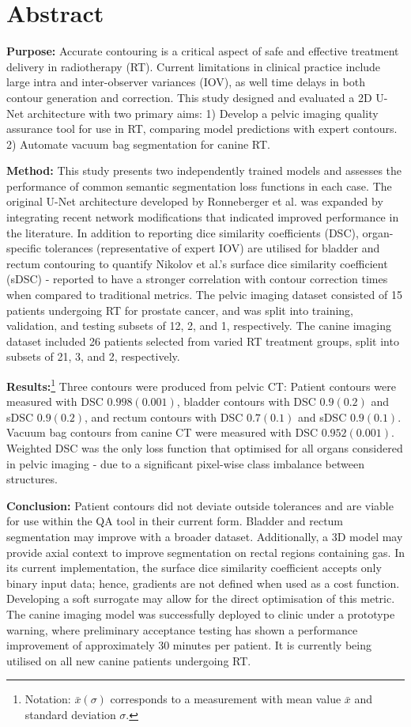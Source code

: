 \chapter{Abstract} \label{ch:abstract}

\textbf{Purpose:} Accurate contouring is a critical aspect of safe and effective
treatment delivery in radiotherapy (RT). Current limitations in clinical
practice include large intra and inter-observer variances (IOV), as well time
delays in both contour generation and correction. This study designed and
evaluated a 2D U-Net architecture with two primary aims:
1) Develop a pelvic imaging quality assurance tool for use in
RT, comparing model predictions with expert contours. 2) Automate vacuum bag
segmentation for canine RT.

\textbf{Method:} This study presents two independently trained models and
assesses the performance of common semantic segmentation loss functions in each
case. The original U-Net architecture developed by Ronneberger et al. was
expanded by integrating recent network modifications that indicated improved
performance in the literature. In addition to reporting dice similarity
coefficients (DSC), organ-specific tolerances (representative of expert IOV) are
utilised for bladder and rectum contouring to quantify Nikolov et al.'s surface
dice similarity coefficient (sDSC) - reported to have a stronger
correlation with contour correction times when compared to traditional metrics.
The pelvic imaging dataset consisted of 15 patients undergoing RT for prostate
cancer, and was split into training, validation, and testing subsets of 12, 2,
and 1, respectively. The canine imaging dataset included 26 patients selected
from varied RT treatment groups, split into subsets of 21, 3, and 2, respectively.

\textbf{Results:}\footnote{Notation: $\bar{x}(\sigma)$ corresponds to a
measurement with mean value $\bar{x}$ and standard deviation $\sigma$.} Three
contours were produced from pelvic CT: Patient contours were measured with DSC
$0.998(0.001)$, bladder contours with DSC $0.9(0.2)$ and sDSC $0.9(0.2)$, and
rectum contours with DSC $0.7(0.1)$ and sDSC $0.9(0.1)$. Vacuum bag contours
from canine CT were measured with DSC $0.952(0.001)$. Weighted DSC was the only
loss function that optimised for all organs considered in pelvic imaging -
due to a significant pixel-wise class imbalance between structures.

\textbf{Conclusion:} Patient contours did not deviate outside tolerances and are
viable for use within the QA tool in their current form. Bladder and rectum
segmentation may improve with a broader dataset. Additionally, a 3D model may
provide axial context to improve segmentation on rectal regions containing gas.
In its current implementation, the surface dice similarity coefficient accepts
only binary input data; hence, gradients are not defined when used as a cost
function. Developing a soft surrogate may allow for the direct optimisation of
this metric. The canine imaging model was successfully deployed to clinic under
a prototype warning, where preliminary acceptance testing has shown a
performance improvement of approximately 30 minutes per patient. It is currently
being utilised on all new canine patients undergoing RT.